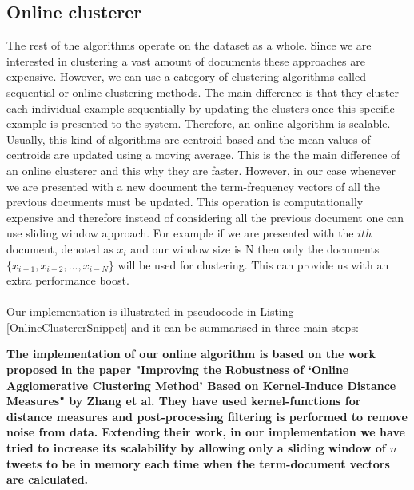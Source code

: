 \subsection{Online clusterer}
The rest of the algorithms operate on the dataset as a whole. Since we are interested in clustering a vast amount of documents these approaches are expensive. However, we can use a category of clustering algorithms called sequential or online clustering methods. The main difference is that they cluster each individual example sequentially by updating the clusters once this specific example is presented to the system. Therefore, an online algorithm is scalable. Usually, this kind of algorithms are centroid-based and the mean values of centroids are updated using a moving average. This is the the main difference of an online clusterer and this why they are faster. However, in our case whenever we are presented with a new document the term-frequency vectors of all the previous documents must be updated. This operation is computationally expensive and therefore instead of considering all the previous document one can use sliding window approach. For example if we are presented with the $ith$ document, denoted as $x_i$ and our window size is N then only the documents $\{ x_{i-1}, x_{i-2},..., x_{i-N}\}$ will be used for clustering. This can provide us with an extra performance boost. \\\\
Our implementation is illustrated in pseudocode in Listing \ref{OnlineClustererSnippet} and it can be summarised in three main steps:

\textbf{The implementation of our online algorithm is based on the work proposed in the paper "Improving the Robustness of ‘Online Agglomerative Clustering Method’ Based on Kernel-Induce Distance Measures" by Zhang et al. They have used kernel-functions for distance measures and post-processing filtering is performed to remove noise from data. Extending their work, in our implementation we have tried to increase its scalability by allowing only a sliding window of $n$ tweets to be in memory each time when the term-document vectors are calculated.} 

